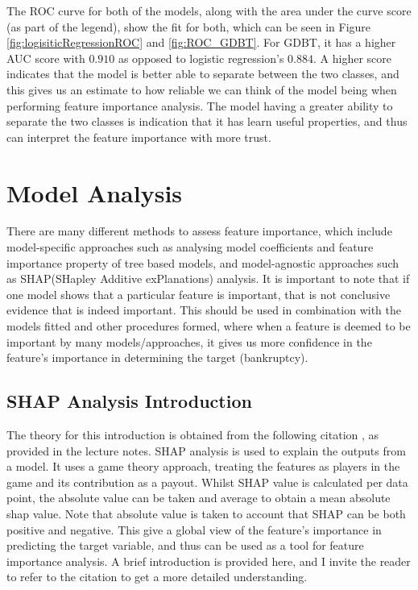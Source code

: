 \documentclass[11pt]{article}
\begin{document}
The ROC curve for both of the models, along with the area under the curve score (as part of the legend), show the fit for both, which can be seen in Figure \ref{fig:logisiticRegressionROC} and \ref{fig:ROC_GDBT}. For GDBT, it has a higher AUC score with $0.910$ as opposed to logistic regression's $0.884$. A higher score indicates that the model is better able to separate between the two classes, and this gives us an estimate to how reliable we can think of the model being when performing feature importance analysis. The model having a greater ability to separate the two classes is indication that it has learn useful properties, and thus can interpret the feature importance with more trust.

\section{Model Analysis}
There are many different methods to assess feature importance, which include model-specific approaches such as analysing model coefficients and feature importance property of tree based models, and model-agnostic approaches such as SHAP(SHapley Additive exPlanations) analysis. It is important to note that if one model shows that a particular feature is important, that is not conclusive evidence that is indeed  important. This should be used in combination with the models fitted and other procedures formed, where when a feature is deemed to be important by many models/approaches, it gives us more confidence in the feature's importance in determining the target (bankruptcy). 

\subsection{SHAP Analysis Introduction}
The theory for this introduction is obtained from the following citation \cite{shap_introduction}, as provided in the lecture notes. SHAP analysis is used to explain the outputs from a model. It uses a game theory approach, treating the features as players in the game and its contribution as a payout. Whilst SHAP value is calculated per data point, the absolute value can be taken and average to obtain a mean absolute shap value. Note that absolute value is taken to account that SHAP can be both positive and negative. This give a global view of the feature's importance in predicting the target variable, and thus can be used as a tool for feature importance analysis. A brief introduction is provided here, and I invite the reader to refer to the citation to get a more detailed understanding.
\end{document}
